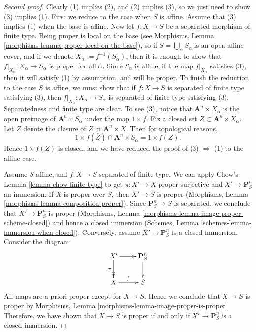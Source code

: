 \documentclass{stacks-project}
\theoremstyle{plain}
\theoremstyle{definition}
\theoremstyle{remark}
\numberwithin{equation}{subsection}
\begin{document}
\begin{proof}[Second proof]
Clearly (1) implies (2), and (2) implies (3), so we just need to show (3)
implies (1).
First we reduce to the case when $S$ is affine.  Assume that (3) implies (1)
when the base is affine.  Now let $f: X \to S$ be a separated morphism of
finite type.  Being proper is local on the base
(see Morphisms, Lemma \ref{morphisms-lemma-proper-local-on-the-base}), so if
$S = \bigcup_\alpha S_\alpha$ is an open affine cover, and if
we denote $X_\alpha := f^{-1}(S_\alpha)$, then it is
enough to show that $f|_{X_\alpha}: X_\alpha \to S_\alpha$ is proper
for all $\alpha$.  Since $S_\alpha$ is affine, if
the map $f|_{X_\alpha}$ satisfies (3), then it will satisfy (1)
by assumption, and will be proper.  To finish the reduction to the
case $S$ is affine, we must show that if $f: X \to S$ is separated of
finite type satisfying (3), then $f|_{X_\alpha} : X_\alpha \to S_\alpha$
is separated of finite type satisfying (3).  Separatedness and finite
type are clear.  To see (3), notice that
$\mathbf{A}^n \times X_\alpha$ is the open preimage of
$\mathbf{A}^n \times S_\alpha$ under the map $1 \times f$.  Fix a closed
set $Z \subset \mathbf A^n \times X_\alpha$.  Let $\bar Z$ denote the
closure of $Z$ in $\mathbf{A}^n \times X$.  Then for topological
reasons,
$$
1 \times f(\bar Z) \cap \mathbf{A}^n \times S_\alpha  = 1 \times f(Z).
$$
Hence $1 \times f(Z)$ is closed, and we have reduced the proof of
(3) $\Rightarrow$ (1) to the affine case.

\medskip\noindent
Assume $S$ affine, and $f : X \to S$ separated of finite type.
We can apply Chow's Lemma \ref{lemma-chow-finite-type}
to get $\pi : X' \to X$ proper surjective and $X' \to \mathbf{P}^n_S$
an immersion. If $X$ is proper over $S$, then $X' \to S$ is proper
(Morphisms, Lemma \ref{morphisms-lemma-composition-proper}). Since
$\mathbf{P}^n_S \to S$ is separated, we conclude that $X' \to
\mathbf{P}^n_S$ is proper
(Morphisms, Lemma \ref{morphisms-lemma-image-proper-scheme-closed})
and hence a closed immersion
(Schemes, Lemma \ref{schemes-lemma-immersion-when-closed}).
Conversely, assume $X' \to \mathbf{P}^n_S$ is a closed immersion.
Consider the diagram:
\begin{equation}
\label{equation-check-proper}
\xymatrix{
X' \ar[r] \ar@{->>}[d]_{\pi} &
\mathbf{P}^n_S \ar[d] \\
X \ar[r]^f & S
}
\end{equation}
All maps are a priori proper except for $X \to S$.
Hence we conclude that $X \to S$ is proper by
Morphisms, Lemma \ref{morphisms-lemma-image-proper-is-proper}.
Therefore, we have shown that $X \to S$ is proper if and only if
$X' \to \mathbf{P}^n_S$ is a closed immersion.


\end{proof}
\end{document}
